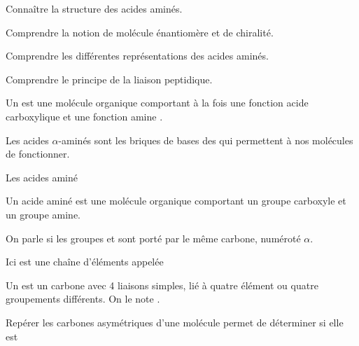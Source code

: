 \teteTermStssBiom

\vspace*{-40pt}

\begin{objectifs}
  \item Connaître la structure des acides aminés.
  \item Comprendre la notion de molécule énantiomère et de chiralité.
  \item Comprendre les différentes représentations des acides aminés.
  \item Comprendre le principe de la liaison peptidique.
\end{objectifs}

\begin{contexte}
  Un  est une molécule organique comportant à la fois une fonction acide carboxylique  et une fonction amine .

  Les acides $\alpha$-aminés sont les briques de bases des  qui permettent à nos molécules de fonctionner. 
  
\end{contexte}


\begin{doc}{Les acides aminé}
  \begin{figure}
    \centering
    \vspace*{-24pt}
  \end{figure}
  Un acide aminé est une molécule organique comportant un groupe carboxyle et un groupe amine.

  \begin{importants}
    On parle  si les groupes  et  sont porté par le même carbone, numéroté $\alpha$.
  \end{importants}
  
  \begin{figure}
    \centering
    \vspace*{-10pt}
  \end{figure}

  Ici  est une chaîne d'éléments appelée 
  
  \begin{importants}  
    Un  est un carbone avec 4 liaisons simples, lié à quatre élément ou quatre groupements différents.
    On le note .
  \end{importants}

  Repérer les carbones asymétriques d'une molécule permet de déterminer si elle est 
\end{doc}

